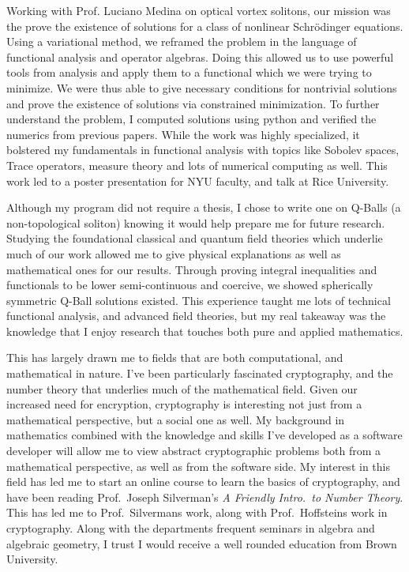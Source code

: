 \documentclass[11pt]{article}
\begin{document}
Working with Prof. Luciano Medina on optical vortex solitons, our mission was the prove the existence of solutions for a class of nonlinear Schr\"{o}dinger equations. Using a variational method, we reframed the problem in the language of functional analysis and operator algebras. Doing this allowed us to use powerful tools from analysis and apply them to a functional which we were trying to minimize. We were thus able to give necessary conditions for nontrivial solutions and prove the existence of solutions via constrained minimization. To further understand the problem, I computed solutions using python and verified the numerics from previous papers. While the work was highly specialized, it bolstered my fundamentals in functional analysis with topics like Sobolev spaces, Trace operators, measure theory and lots of numerical computing as well. This work led to a poster presentation for NYU faculty, and talk at Rice University.

Although my program did not require a thesis, I chose to write one on Q-Balls (a non-topological soliton) knowing it would help prepare me for future research. Studying the foundational classical and quantum field theories which underlie much of our work allowed me to give physical explanations as well as mathematical ones for our results. Through proving integral inequalities and functionals to be lower semi-continuous and coercive, we showed spherically symmetric Q-Ball solutions existed. This experience taught me lots of technical functional analysis, and advanced field theories, but my real takeaway was the knowledge that I enjoy research that touches both pure and applied mathematics.

This has largely drawn me to fields that are both computational, and mathematical in nature. I've been particularly fascinated cryptography, and the number theory that underlies much of the mathematical field. Given our increased need for encryption, cryptography is interesting not just from a mathematical perspective, but a social one as well. My background in mathematics combined with the knowledge and skills I've developed as a software developer will allow me to view abstract cryptographic problems both from a mathematical perspective, as well as from the software side. My interest in this field has led me to start an online course to learn the basics of cryptography, and have been reading Prof.\ Joseph Silverman's \textit{A Friendly Intro.\ to Number Theory}. This has led me to Prof.\ Silvermans work, along with Prof.\ Hoffsteins work in cryptography. Along with the departments frequent seminars in algebra and algebraic geometry, I trust I would receive a well rounded education from Brown University.
\end{document}
